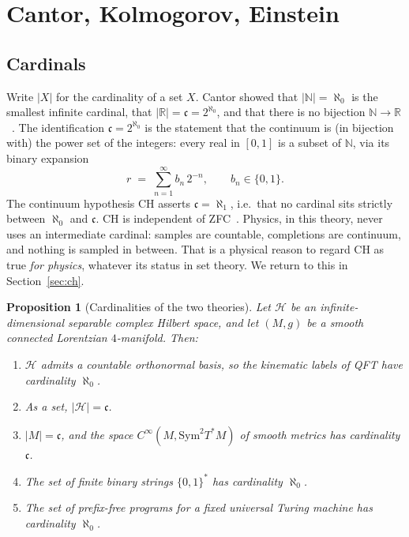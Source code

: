 \documentclass[11pt,a4paper]{article}
\theoremstyle{plain}
\newtheorem{proposition}[theorem]{Proposition}
\theoremstyle{definition}
\theoremstyle{remark}
\newcommand{\N}{\mathbb{N}}
\newcommand{\R}{\mathbb{R}}
\newcommand{\alef}{\aleph_{0}}
\newcommand{\cont}{\mathfrak{c}}
\newcommand{\Hil}{\mathcal{H}}
\newcommand{\abs}[1]{\lvert#1\rvert}
\begin{document}
\section{Cantor, Kolmogorov, Einstein}

\subsection{Cardinals}

Write $\abs{X}$ for the cardinality of a set $X$.
Cantor showed that $\abs{\N}=\alef$ is the smallest infinite cardinal, that $\abs{\R}=\cont=2^{\alef}$, and that there is no bijection $\N\to\R$~\cite{cantor1874,cantor1891}.
The identification $\cont=2^{\alef}$ is the statement that the continuum is (in bijection with) the power set of the integers: every real in $[0,1]$ is a subset of $\N$, via its binary expansion
\begin{equation}
  r \;=\; \sum_{n=1}^{\infty} b_{n}\,2^{-n},\qquad b_{n}\in\{0,1\}.
  \label{eq:binary}
\end{equation}
The continuum hypothesis $\mathrm{CH}$ asserts $\cont=\aleph_{1}$, i.e.\ that no cardinal sits strictly between $\alef$ and $\cont$.
$\mathrm{CH}$ is independent of ZFC~\cite{godel1940,cohen1963}.
Physics, in this theory, never uses an intermediate cardinal: samples are countable, completions are continuum, and nothing is sampled in between.
That is a physical reason to regard $\mathrm{CH}$ as true \emph{for physics}, whatever its status in set theory.
We return to this in Section~\ref{sec:ch}.

\begin{proposition}[Cardinalities of the two theories]
\label{prop:card}
Let $\Hil$ be an infinite-dimensional separable complex Hilbert space, and let $(M,g)$ be a smooth connected Lorentzian $4$-manifold.
Then:
\begin{enumerate}
  \item $\Hil$ admits a countable orthonormal basis, so the kinematic labels of QFT have cardinality $\alef$.
  \item As a set, $\abs{\Hil}=\cont$.
  \item $\abs{M}=\cont$, and the space $C^{\infty}(M,\mathrm{Sym}^{2}T^{*}M)$ of smooth metrics has cardinality $\cont$.
  \item The set of finite binary strings $\{0,1\}^{*}$ has cardinality $\alef$.
  \item The set of prefix-free programs for a fixed universal Turing machine has cardinality $\alef$.
\end{enumerate}
\end{proposition}
\end{document}
